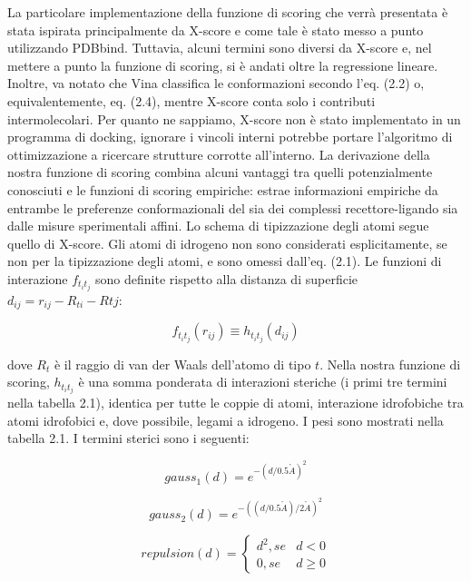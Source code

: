 La particolare implementazione della funzione di scoring che verrà presentata è stata ispirata principalmente da X-score e come tale è stato messo a punto utilizzando PDBbind. Tuttavia, alcuni termini sono diversi da X-score e, nel mettere a punto la funzione di scoring, si è andati oltre la regressione lineare. Inoltre, va notato che Vina classifica le conformazioni secondo l'eq. (2.2) o, equivalentemente, eq. (2.4), mentre X-score conta solo i contributi intermolecolari.
Per quanto ne sappiamo, X-score non è stato implementato in un programma di docking, ignorare i vincoli interni potrebbe portare l'algoritmo di ottimizzazione a ricercare strutture corrotte all'interno.\newline
La derivazione della nostra funzione di scoring combina alcuni vantaggi tra quelli potenzialmente conosciuti e le funzioni di scoring empiriche: estrae informazioni empiriche da entrambe le preferenze conformazionali del sia dei complessi recettore-ligando sia dalle misure sperimentali affini.\newline 
Lo schema di tipizzazione degli atomi segue quello di X-score. Gli atomi di idrogeno non sono considerati esplicitamente, se non per la tipizzazione degli atomi, e sono omessi dall'eq. (2.1).\newline
Le funzioni di interazione $f_{t_it_j}$ sono definite rispetto alla distanza di superficie  $d_{ij} = r_{ij} - R_{ti} - Rtj$:

\begin{equation}
    f_{t_it_j}(r_{ij}) \equiv h_{t_it_j}(d_{ij})
\end{equation}

dove $R_t$ è il raggio di van der Waals dell'atomo di tipo $t$.\newline
Nella nostra funzione di scoring, $h_{t_it_j}$ è una somma ponderata di interazioni steriche (i primi tre termini nella tabella 2.1), identica per tutte le coppie di atomi, interazione idrofobiche tra atomi idrofobici e, dove possibile, legami a idrogeno. I pesi sono mostrati nella tabella 2.1. I termini sterici sono i seguenti:

\begin{equation}
    gauss_1(d)=e^{-(d/0.5\mathring{A})^2}
\end{equation}

\begin{equation}
    gauss_2(d)=e^{-((d/0.5\mathring{A})/2\mathring{A})^2}
\end{equation}

\begin{equation}
    repulsion(d) = \begin{cases}
                        d^2, se & d < 0\\
                        0, se & d \geq 0
                    \end{cases}
\end{equation}

